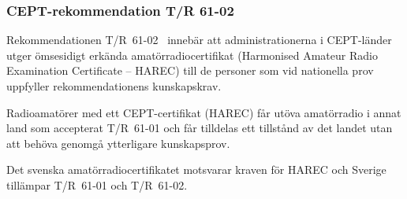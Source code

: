 \subsubsection{CEPT-rekommendation T/R 61-02}

Rekommendationen T/R~61-02~\cite{TR6102} innebär att administrationerna i
CEPT-länder utger ömsesidigt erkända amatörradiocertifikat (Harmonised Amateur
Radio Examination Certificate -- HAREC) till de personer som vid nationella
prov uppfyller rekommendationens kunskapskrav.

Radioamatörer med ett CEPT-certifikat (HAREC) får utöva amatörradio i annat
land som accepterat T/R~61-01 och får tilldelas ett tillstånd av det landet
utan att behöva genomgå ytterligare kunskapsprov.

Det svenska amatörradiocertifikatet motsvarar kraven för HAREC och Sverige
tillämpar T/R~61-01 och T/R~61-02.
